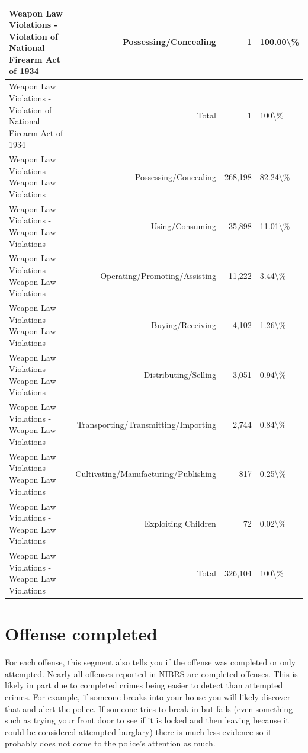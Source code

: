 \documentclass[
]{krantz}
\begin{document}
\begin{longtable}[t]{l|r|r|l}
\hline
Weapon Law Violations - Violation of National Firearm Act of 1934 & Possessing/Concealing & 1 & 100.00\textbackslash{}\%\\
\hline
Weapon Law Violations - Violation of National Firearm Act of 1934 & Total & 1 & 100\textbackslash{}\%\\
\hline
Weapon Law Violations - Weapon Law Violations & Possessing/Concealing & 268,198 & 82.24\textbackslash{}\%\\
\hline
Weapon Law Violations - Weapon Law Violations & Using/Consuming & 35,898 & 11.01\textbackslash{}\%\\
\hline
Weapon Law Violations - Weapon Law Violations & Operating/Promoting/Assisting & 11,222 & 3.44\textbackslash{}\%\\
\hline
Weapon Law Violations - Weapon Law Violations & Buying/Receiving & 4,102 & 1.26\textbackslash{}\%\\
\hline
Weapon Law Violations - Weapon Law Violations & Distributing/Selling & 3,051 & 0.94\textbackslash{}\%\\
\hline
Weapon Law Violations - Weapon Law Violations & Transporting/Transmitting/Importing & 2,744 & 0.84\textbackslash{}\%\\
\hline
Weapon Law Violations - Weapon Law Violations & Cultivating/Manufacturing/Publishing & 817 & 0.25\textbackslash{}\%\\
\hline
Weapon Law Violations - Weapon Law Violations & Exploiting Children & 72 & 0.02\textbackslash{}\%\\
\hline
Weapon Law Violations - Weapon Law Violations & Total & 326,104 & 100\textbackslash{}\%\\
\hline
\end{longtable}

\section{Offense completed}\label{offense-completed}

For each offense, this segment also tells you if the offense
was completed or only attempted. Nearly all offenses
reported in NIBRS are completed offenses. This is likely in
part due to completed crimes being easier to detect than
attempted crimes. For example, if someone breaks into your
house you will likely discover that and alert the police. If
someone tries to break in but fails (even something such as
trying your front door to see if it is locked and then
leaving because it could be considered attempted burglary)
there is much less evidence so it probably does not come to
the police's attention as much.
\end{document}

